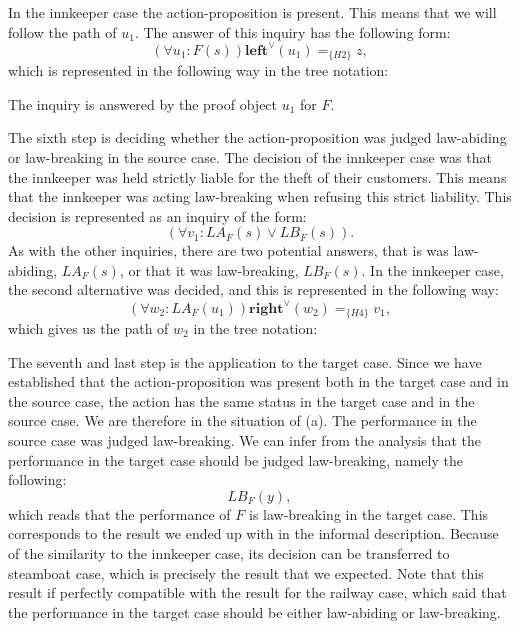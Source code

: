 			In the innkeeper case the action-proposition is present. This means that we will follow the path of $u_1$. The answer of this inquiry has the following form:
				\[
					(\forall u_1 : F(s)) \textbf{left}^\lor (u_1) =_{\{H2\}} z,
				\]
			which is represented in the following way in the tree notation:
			\noindent\begin{minipage}{\textwidth}
			\end{minipage}\medskip
			
			The inquiry is answered by the proof object $u_1$ for $F$.
			
			The sixth step is deciding whether the action-proposition was judged law-abiding or law-breaking in the source case. The decision of the innkeeper case was that the innkeeper was held strictly liable for the theft of their customers. This means that the innkeeper was acting law-breaking when refusing this strict liability. This decision is represented as an inquiry of the form:
				\[
					(\forall v_1 : LA_F(s) \lor LB_F(s)).
				\]
			As with the other inquiries, there are two potential answers, that is was law-abiding, $LA_F(s)$, or that it was law-breaking, $LB_F(s)$. In the innkeeper case, the second alternative was decided, and this is represented in the following way:
				\[
					(\forall w_2 : LA_F(u_1)) \textbf{right}^\lor (w_2) =_{\{H4\}} v_1,
				\]
			which gives us the path of $w_2$ in the tree notation: \newline
				\noindent\begin{minipage}{\textwidth}
				\end{minipage}\medskip
				
			The seventh and last step is the application to the target case. Since we have established that the action-proposition was present both in the target case and in the source case, the action has the same status in the target case and in the source case. We are therefore in the situation of (a). The performance in the source case was judged law-breaking. We can infer from the analysis that the performance in the target case should be judged law-breaking, namely the following:
				\[
					LB_F (y),
				\]	
			which reads that the performance of $F$ is law-breaking in the target case. This corresponds to the result we ended up with in the informal description. Because of the similarity to the innkeeper case, its decision can be transferred to steamboat case, which is precisely the result that we expected. Note that this result if perfectly compatible with the result for the railway case, which said that the performance in the target case should be either law-abiding or law-breaking.
		
